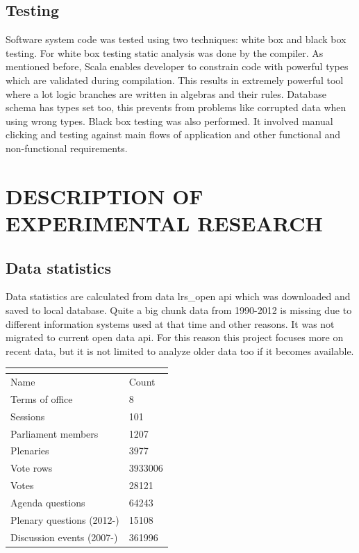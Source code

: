 \documentclass[a4paper,12pt]{article}
\begin{document}
 	\subsection{Testing}
 	
 	Software system code was tested using two techniques: white box and black box testing. For white box testing static analysis was done by the compiler. As mentioned before, Scala enables developer to constrain code with powerful types which are validated during compilation. This results in extremely powerful tool where a lot logic branches are written in algebras and their rules. Database schema has types set too, this prevents from problems like corrupted data when using wrong types. Black box testing was also performed. It involved manual clicking and testing against main flows of application and other functional and non-functional requirements. 
 	
 	
	\clearpage
	
	\section{DESCRIPTION OF EXPERIMENTAL RESEARCH}
	\subsection{Data statistics}
	
	Data statistics are calculated from data \gls{lrs_open} \acrshort{api} which was downloaded and saved to local database. Quite a big chunk data from 1990-2012 is missing due to different information systems used at that time and other reasons. It was not migrated to current open data \acrshort{api}. For this reason this project focuses more on recent data, but it is not limited to analyze older data too if it becomes available.
	
	\noindent
	\begin{center}
		\begin{tabular}{L{5cm} R{3cm}}
			\\ 
			\hline
			Name & Count \\\hline
			Terms of office & 8\\
			Sessions & 101\\
			Parliament members & 1207\\
			Plenaries & 3977\\
			Vote rows & 3933006\\
			Votes & 28121\\
			Agenda questions & 64243\\
			Plenary questions (2012-) & 15108\\
			Discussion events (2007-) & 361996\\
			\hline
		\end{tabular}
		 \label{tab:data_statistics}
	\end{center}
	
\end{document}
